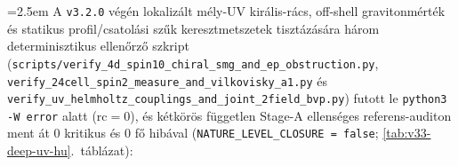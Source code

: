 \documentclass[11pt,a4paper]{article}
\begin{document}
{\emergencystretch=2.5em
A \texttt{v3.2.0} végén lokalizált mély-UV királis-rács, off-shell gravitonmérték és statikus profil/csatolási szűk keresztmetszetek tisztázására három determinisztikus ellenőrző szkript (\texttt{scripts/\allowbreak verify\_\allowbreak 4d\_\allowbreak spin10\_\allowbreak chiral\_\allowbreak smg\_\allowbreak and\_\allowbreak ep\_\allowbreak obstruction.py}, \texttt{verify\_\allowbreak 24cell\_\allowbreak spin2\_\allowbreak measure\_\allowbreak and\_\allowbreak vilkovisky\_\allowbreak a1.py} és \texttt{verify\_\allowbreak uv\_\allowbreak helmholtz\_\allowbreak couplings\_\allowbreak and\_\allowbreak joint\_\allowbreak 2field\_\allowbreak bvp.py}) futott le \texttt{python3 -W error} alatt ($\mathrm{rc}=0$), és kétkörös független Stage-A ellenséges referens-auditon ment át $0$ kritikus és $0$ fő hibával (\texttt{NATURE\_\allowbreak LEVEL\_\allowbreak CLOSURE = false}; \ref{tab:v33-deep-uv-hu}.~táblázat):

}
\end{document}

